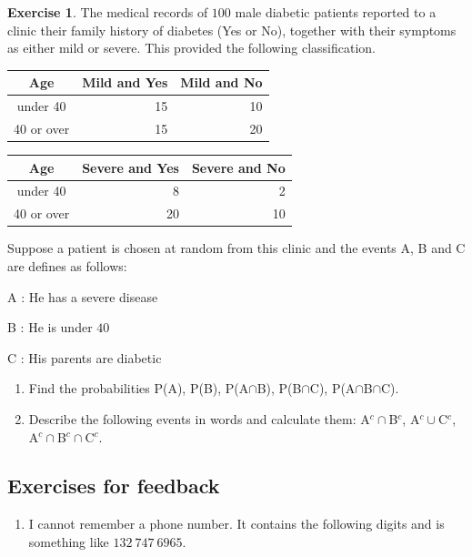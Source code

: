 \documentclass[
]{book}
\providecommand{\tightlist}{%
  \setlength{\itemsep}{0pt}\setlength{\parskip}{0pt}}
\theoremstyle{definition}
\theoremstyle{definition}
\theoremstyle{definition}
\newtheorem{exercise}{Exercise}[chapter]
\theoremstyle{definition}
\theoremstyle{remark}
\begin{document}
\begin{exercise}

The medical records of \(100\) male diabetic patients reported to a clinic their family history of diabetes (Yes or No), together with their symptoms as either mild or severe. This provided the following classification.

\begin{longtable}[]{@{}crr@{}}
\toprule
Age & Mild and Yes & Mild and No\tabularnewline
\midrule
\endhead
under 40 & 15 & 10\tabularnewline
40 or over & 15 & 20\tabularnewline
\bottomrule
\end{longtable}

\begin{longtable}[]{@{}crr@{}}
\toprule
Age & Severe and Yes & Severe and No\tabularnewline
\midrule
\endhead
under 40 & 8 & 2\tabularnewline
40 or over & 20 & 10\tabularnewline
\bottomrule
\end{longtable}

Suppose a patient is chosen at random from this clinic and the events A, B and C are defines as follows:

A : He has a severe disease

B : He is under \(40\)

C : His parents are diabetic

\begin{enumerate}
\def\labelenumi{\alph{enumi})}
\item
  Find the probabilities P(A), P(B), P(A\(\cap\)B), P(B\(\cap\)C), P(A\(\cap\)B\(\cap\)C).
\item
  Describe the following events in words and calculate them: A\(^c\cap\)B\(^c\), A\(^c\cup\)C\(^c\), A\(^c\cap\)B\(^c\cap\)C\(^c\).
\end{enumerate}

\end{exercise}

\hypertarget{exercises-for-feedback}{%
\subsection{Exercises for feedback}\label{exercises-for-feedback}}

\begin{enumerate}
\def\labelenumi{\arabic{enumi}.}
\tightlist
\item
  I cannot remember a phone number. It contains the following digits and is something like \(132 \ 747 \ 6965\).
\end{enumerate}
\end{document}
